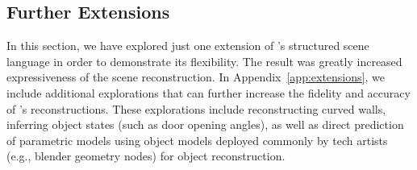 \subsection{Further Extensions}
In this section, we have explored just one extension of \METHOD's structured scene language in order to demonstrate its flexibility. The result was greatly increased expressiveness of the scene reconstruction. 
In Appendix~\ref{app:extensions},
we include additional explorations that can further increase the fidelity and accuracy of \METHOD's reconstructions. These explorations include reconstructing curved walls, inferring object states (such as door opening angles), as well as direct prediction of parametric models using object models deployed commonly by tech artists (e.g., blender geometry nodes) for object reconstruction.

